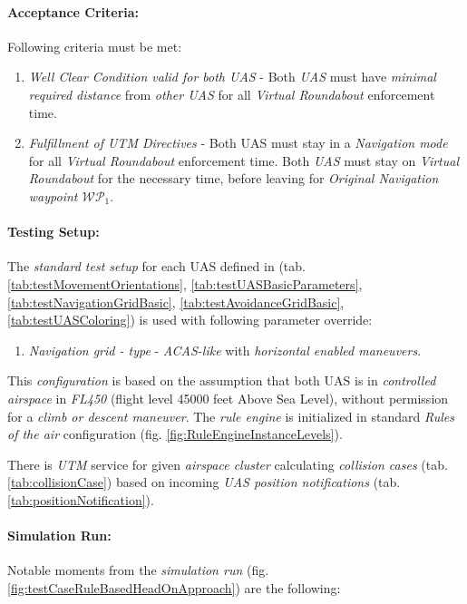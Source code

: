 \paragraph{Acceptance  Criteria:} Following criteria must be met:

\begin{enumerate}
    \item \emph{Well Clear Condition valid for both UAS} - Both \emph{UAS} must have \emph{minimal required distance} from \emph{other UAS} for all \emph{Virtual Roundabout} enforcement time.
    
    \item \emph{Fulfillment of UTM Directives} - Both UAS must stay in a \emph{Navigation mode} for all \emph{Virtual Roundabout} enforcement time. Both \emph{UAS} must stay on \emph{Virtual Roundabout} for the necessary time, before leaving for \emph{Original Navigation waypoint $\mathscr{WP}_1$}.
\end{enumerate}

\paragraph{Testing Setup:} The \emph{standard test setup} for each UAS defined in (tab. \ref{tab:testMovementOrientations}, \ref{tab:testUASBasicParameters}, \ref{tab:testNavigationGridBasic}, \ref{tab:testAvoidanceGridBasic}, \ref{tab:testUASColoring}) is used with following parameter override:
\begin{enumerate}
    \item \emph{Navigation grid - type} - \emph{ACAS-like} with \emph{horizontal enabled maneuvers}.
\end{enumerate}

This \emph{configuration} is based on the assumption that both UAS is in \emph{controlled airspace} in \emph{FL450} (flight level 45000 feet Above Sea Level), without permission for a \emph{climb or descent maneuver}. The \emph{rule engine} is initialized in standard \emph{Rules of the air} configuration (fig. \ref{fig:RuleEngineInstanceLevels}).

There is \emph{UTM} service for given \emph{airspace cluster} calculating \emph{collision cases} (tab. \ref{tab:collisionCase}) based on incoming \emph{UAS position notifications} (tab. \ref{tab:positionNotification}).

\paragraph{Simulation Run:} Notable moments from the \emph{simulation run} (fig. \ref{fig:testCaseRuleBasedHeadOnApproach}) are the following:


